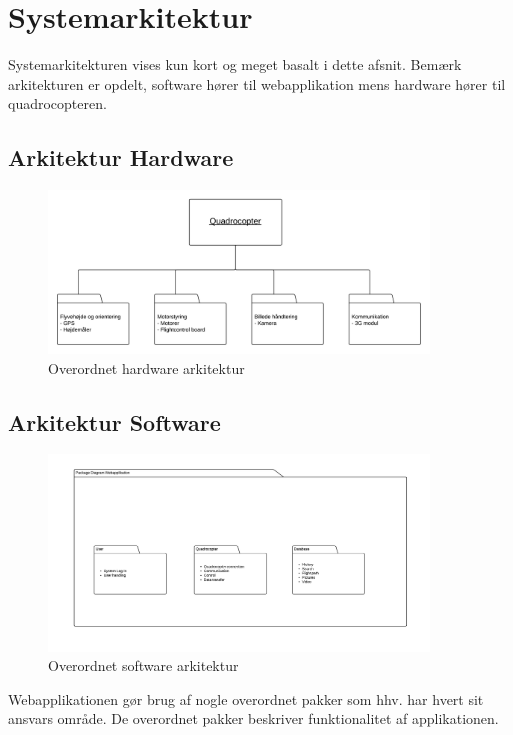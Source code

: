 \chapter{Systemarkitektur}
\label{chap:arkitektur}

Systemarkitekturen vises kun kort og meget basalt i dette afsnit.
Bemærk arkitekturen er opdelt, software hører til webapplikation mens hardware hører til quadrocopteren.


\section{Arkitektur Hardware}
\label{sec:Arkitektur hw}

\begin{figure}[H]
\centering
\includegraphics[width=0.9\textwidth]{Billeder/hw_arkitektur.png}
\caption{Overordnet hardware arkitektur}
\label{fig:hw_arkitektur}
\end{figure}		

\newpage

\section{Arkitektur Software}
\label{sec:Arkitektur sw}

\begin{figure}[H]
\centering
\includegraphics[width=0.9\textwidth]{Billeder/sw-arkitektur.png}
\caption{Overordnet software arkitektur}
\label{fig:sw_arkitektur}
\end{figure}	

Webapplikationen gør brug af nogle overordnet pakker som hhv. har hvert sit ansvars område. De overordnet pakker beskriver funktionalitet af applikationen.